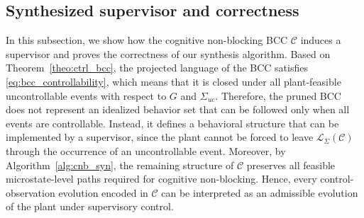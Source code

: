 \documentclass[journal,twoside,web]{ieeecolor}
\begin{document}
\subsection{Synthesized supervisor and correctness}

In this subsection, we show how the cognitive non-blocking BCC 
$\mathcal{C}$ induces a supervisor and proves the correctness of our synthesis
algorithm.
%
Based on Theorem~\ref{theo:ctrl_bcc}, the projected language of the BCC 
satisfies \eqref{eq:bcc_controllability}, which means that it is closed under
all plant-feasible uncontrollable events with respect to $G$ and
$\Sigma_{uc}$.
%
Therefore, the pruned BCC does not represent an idealized behavior set that can
be followed only when all events are controllable. Instead, it defines a
behavioral structure that can be implemented by a supervisor, since the plant
cannot be forced to leave $\mathcal{L}_{\Sigma}(\mathcal{C})$ through the
occurrence of an uncontrollable event.
%
Moreover, by Algorithm~\ref{alg:cnb_syn}, the remaining structure of
$\mathcal{C}$ preserves all feasible microstate-level paths required for
cognitive non-blocking. Hence, every control-observation evolution encoded in
$\mathcal{C}$ can be interpreted as an admissible evolution of the plant
under supervisory control.
\end{document}

